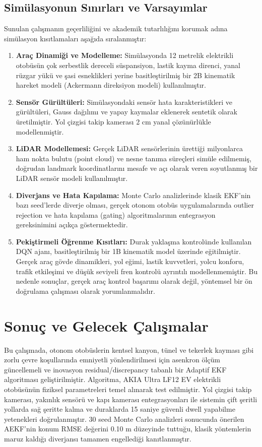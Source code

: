 ﻿\documentclass[conference]{IEEEtran}
\begin{document}
\subsection{Simülasyonun Sınırları ve Varsayımlar}
Sunulan çalışmanın geçerliliğini ve akademik tutarlılığını korumak adına simülasyon kısıtlamaları aşağıda sıralanmıştır:
\begin{enumerate}
    \item \textbf{Araç Dinamiği ve Modelleme:} Simülasyonda 12 metrelik elektrikli otobüsün çok serbestlik dereceli süspansiyon, lastik kayma direnci, yanal rüzgar yükü ve şasi esneklikleri yerine basitleştirilmiş bir 2B kinematik hareket modeli (Ackermann direksiyon modeli) kullanılmıştır.
    \item \textbf{Sensör Gürültüleri:} Simülasyondaki sensör hata karakteristikleri ve gürültüleri, Gauss dağılımı ve yapay kaymalar eklenerek sentetik olarak üretilmiştir. Yol çizgisi takip kamerası 2 cm yanal çözünürlükle modellenmiştir.
    \item \textbf{LiDAR Modellemesi:} Gerçek LiDAR sensörlerinin ürettiği milyonlarca ham nokta bulutu (point cloud) ve nesne tanıma süreçleri simüle edilmemiş, doğrudan landmark koordinatlarını mesafe ve açı olarak veren soyutlanmış bir LiDAR sensör modeli kullanılmıştır.
    \item \textbf{Diverjans ve Hata Kapılama:} Monte Carlo analizlerinde klasik EKF'nin bazı seed'lerde diverje olması, gerçek otonom otobüs uygulamalarında outlier rejection ve hata kapılama (gating) algoritmalarının entegrasyon gereksinimini açıkça göstermektedir.
    \item \textbf{Pekiştirmeli Öğrenme Kısıtları:} Durak yaklaşma kontrolünde kullanılan DQN ajanı, basitleştirilmiş bir 1B kinematik model üzerinde eğitilmiştir. Gerçek araç gövde dinamikleri, yol eğimi, lastik kuvvetleri, yolcu konforu, trafik etkileşimi ve düşük seviyeli fren kontrolü ayrıntılı modellenmemiştir. Bu nedenle sonuçlar, gerçek araç kontrol başarımı olarak değil, yöntemsel bir ön doğrulama çalışması olarak yorumlanmalıdır.
\end{enumerate}

\section{Sonuç ve Gelecek Çalışmalar}
Bu çalışmada, otonom otobüslerin kentsel kanyon, tünel ve tekerlek kayması gibi zorlu çevre koşullarında emniyetli yönlendirilmesi için asenkron ölçüm güncellemeli ve inovasyon residual/discrepancy tabanlı bir Adaptif EKF algoritması geliştirilmiştir. Algoritma, AKIA Ultra LF12 EV elektrikli otobüsünün fiziksel parametreleri temel alınarak test edilmiştir. Yol çizgisi takip kamerası, yakınlık sensörü ve kapı kamerası entegrasyonları ile sistemin çift şeritli yollarda sağ şeritte kalma ve duraklarda 15 saniye güvenli dwell yapabilme yetenekleri doğrulanmıştır. 30 seed Monte Carlo analizleri sonucunda önerilen AEKF'nin konum RMSE değerini 0.10 m düzeyinde tuttuğu, klasik yöntemlerin maruz kaldığı diverjansı tamamen engellediği kanıtlanmıştır.
\end{document}
